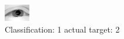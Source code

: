 \begin{figure}[h!]
\begin{center}
\includegraphics[width=0.60\columnwidth]{figures/ID2227_class_1_target_2.png}
\end{center}
\caption{ Classification: 1 actual target: 2}
\label{fig:ID2227_class_1_target_2}
\end{figure}
